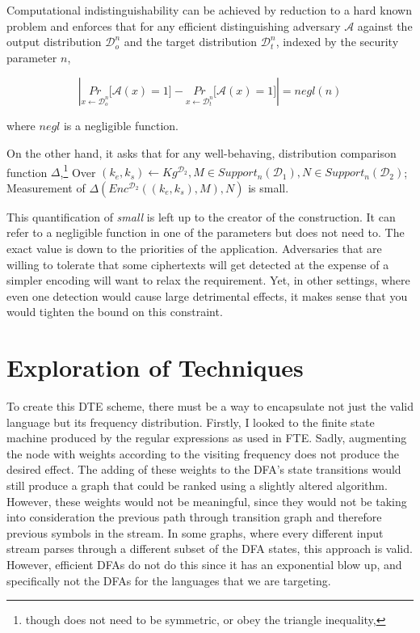 \documentclass[ %
                    author={Samuel Russell},
                supervisor={Prof. Bogdan Warinschi},
                    degree={MEng},
                     title={Innocuous Ciphertexts},
                  subtitle={The DE-CENSOR Scheme},
                      type={research},
                      year={2018} ]{dissertation}
\begin{document}
Computational indistinguishability can be achieved by reduction to a hard known problem and enforces that for any efficient distinguishing adversary $\mathcal{A}$ against the output distribution $\mathcal{D}_o^n$ and the target distribution $\mathcal{D}_t^n$, indexed by the security parameter $n$, 

$$ \left|  \underset{x \leftarrow \mathcal{D}_o^n}{Pr} \big[ \mathcal{A}(x) = 1 \big] - \underset{x \leftarrow \mathcal{D}_t^n}{Pr} \big[ \mathcal{A}(x) = 1 \big]\right| = negl(n)$$

where $negl$ is a negligible function.



On the other hand, it asks that for any well-behaving, distribution comparison function $\Delta$,\footnote{though does not need to be symmetric, or obey the triangle inequality,} Over $ (k_e,k_s) \leftarrow Kg^{\mathcal{D}_2}, M \in Support_n(\mathcal{D}_1), N \in Support_n(\mathcal{D}_2)$; Measurement of $\Delta \left(  Enc^{\mathcal{D}_2}((k_e,k_s), M), N  \right)$ is small.

This quantification of \textit{small} is left up to the creator of the construction.
It can refer to a negligible function in one of the parameters but does not need to.
The exact value is down to the priorities of the application.
Adversaries that are willing to tolerate that some ciphertexts will get detected at the expense of a simpler encoding will want to relax the requirement.
Yet, in other settings, where even one detection would cause large detrimental effects, it makes sense that you would tighten the bound on this constraint.


\section{Exploration of Techniques}\label{exploration_of_techniques}

To create this DTE scheme, there must be a way to encapsulate not just the valid language but its frequency distribution.
Firstly, I looked to the finite state machine produced by the regular expressions as used in FTE. Sadly, augmenting the node with weights according to the visiting frequency does not produce the desired effect.
The adding of these weights to the DFA's state transitions would still produce a graph that could be ranked using a slightly altered algorithm.
However, these weights would not be meaningful, since they would not be taking into consideration the previous path through transition graph and therefore previous symbols in the stream.
In some graphs, where every different input stream parses through a different subset of the DFA states, this approach is valid.
However, efficient DFAs do not do this since it has an exponential blow up, and specifically not the DFAs for the languages that we are targeting.
\end{document}
